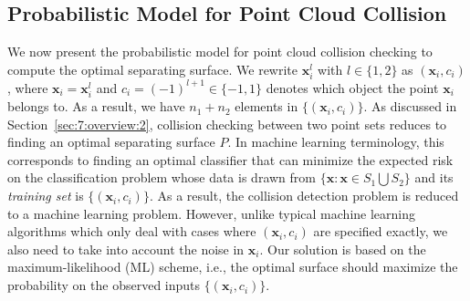\subsection{Probabilistic Model for Point Cloud Collision}
We now present the probabilistic model for point cloud collision checking to compute the optimal separating surface. We rewrite $\mathbf x_i^l$ with $l\in \{1,2\}$ as $(\mathbf x_i, c_i)$, where $\mathbf x_i = \mathbf x_i^l$ and $c_i = (-1)^{l+1} \in \{-1, 1\}$ denotes which object the point $\mathbf x_i$ belongs to.
As a result, we have $n_1 + n_2$ elements in $\{(\mathbf x_i, c_i)\}$. As discussed in Section~\ref{sec:7:overview:2}, collision checking between two point sets reduces
to finding an optimal separating surface $P$. In machine learning terminology, this corresponds to finding an optimal classifier that can minimize the expected risk on the classification problem whose data is drawn
from $\{ \mathbf x: \mathbf x \in S_1 \bigcup S_2\}$ and its {\em training set} is $\{(\mathbf x_i, c_i)\}$. As a result, the collision detection problem is reduced to a
machine learning problem. However, unlike typical machine learning algorithms which only deal with cases where $(\mathbf x_i, c_i)$ are specified exactly, we also need to take into account the noise in $\mathbf x_i$. Our solution is based on the maximum-likelihood (ML) scheme, i.e., the optimal surface should maximize the probability on the observed inputs $\{(\mathbf x_i, c_i)\}$.


